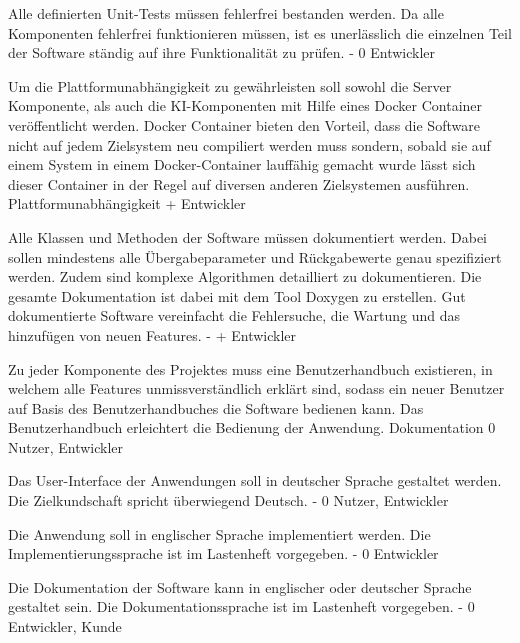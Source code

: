         {Alle definierten Unit-Tests müssen fehlerfrei bestanden werden.}
        {Da alle Komponenten fehlerfrei funktionieren müssen, ist es unerlässlich die einzelnen Teil der Software ständig auf ihre Funktionalität zu prüfen.}
        {-}
        {0}
        {Entwickler}

        {Um die Plattformunabhängigkeit zu gewährleisten soll sowohl die Server Komponente, als auch die KI-Komponenten mit Hilfe eines Docker Container veröffentlicht werden.}
        {Docker Container bieten den Vorteil, dass die Software nicht auf jedem Zielsystem neu compiliert werden muss sondern, sobald sie auf einem System in einem Docker-Container lauffähig gemacht wurde lässt sich dieser Container in der Regel auf diversen anderen Zielsystemen ausführen.}
        {Plattformunabhängigkeit}
        {+}
        {Entwickler}

        {Alle Klassen und Methoden der Software müssen dokumentiert werden. Dabei sollen mindestens alle Übergabeparameter und Rückgabewerte genau spezifiziert werden. Zudem sind komplexe Algorithmen detailliert zu dokumentieren. Die gesamte Dokumentation ist dabei mit dem Tool Doxygen zu erstellen.}
        {Gut dokumentierte Software vereinfacht die Fehlersuche, die Wartung und das hinzufügen von neuen Features.}
        {-}
        {+}
        {Entwickler}

        {Zu jeder Komponente des Projektes muss eine Benutzerhandbuch existieren, in welchem alle Features unmissverständlich erklärt sind, sodass ein neuer Benutzer auf Basis des Benutzerhandbuches die Software bedienen kann.}
        {Das Benutzerhandbuch erleichtert die Bedienung der Anwendung.}
        {Dokumentation}
        {0}
        {Nutzer, Entwickler}

        {Das User-Interface der Anwendungen soll in deutscher Sprache gestaltet werden.}
        {Die Zielkundschaft spricht überwiegend Deutsch.}
        {-}
        {0}
        {Nutzer, Entwickler}

        {Die Anwendung soll in englischer Sprache implementiert werden.}
        {Die Implementierungssprache ist im Lastenheft vorgegeben.}
        {-}
        {0}
        {Entwickler}

        {Die Dokumentation der Software kann in englischer oder deutscher Sprache gestaltet sein.}
        {Die Dokumentationssprache ist im Lastenheft vorgegeben.}
        {-}
        {0}
        {Entwickler, Kunde}

